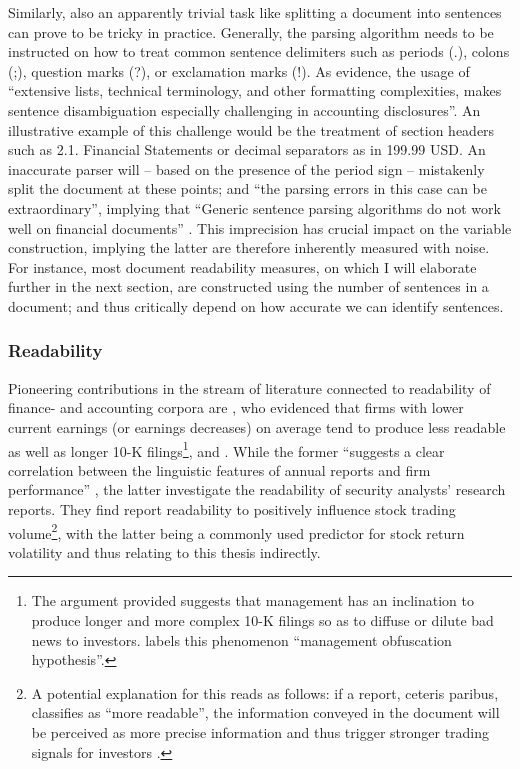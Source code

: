 Similarly, also an apparently trivial task like splitting a document into sentences can prove to be tricky in practice. Generally, the parsing algorithm needs to be instructed on how to treat common sentence delimiters such as periods (\textsf{.}), colons (\textsf{;}), question marks (\textsf{?}), or exclamation marks (\textsf{!}). As \textcite[1216]{LM-meta-2016} evidence, the usage of \enquote{extensive lists, technical terminology, and other formatting complexities, makes sentence disambiguation especially challenging in accounting disclosures}. An illustrative example of this challenge would be the treatment of section headers such as \textsf{2.1. Financial Statements} or decimal separators as in \textsf{199.99 USD}. An inaccurate parser will -- based on the presence of the period sign -- mistakenly split the document at these points; and \enquote{the parsing errors in this case can be extraordinary}, implying that \enquote{Generic sentence parsing algorithms do not work well on financial documents} \parencite[1216, 1217]{LM-meta-2016}. This imprecision has crucial impact on the variable construction, implying the latter are therefore inherently measured with noise. For instance, most document readability measures, on which I will elaborate further in the next section, are constructed using the number of sentences in a document; and thus critically depend on how accurate we can identify sentences. 

\subsubsection{Readability}
\label{sssec: lit_rev_mining_readability}
Pioneering contributions in the stream of literature connected to readability of finance- and accounting corpora are \textcite{Li2008}, who evidenced that firms with lower current earnings (or earnings decreases) on average tend to produce less readable as well as longer 10-K filings\footnote{The argument provided suggests that management has an inclination to produce longer and more complex 10-K filings so as to diffuse or dilute bad news to investors. \textcite[221]{Li2008} labels this phenomenon \enquote{management obfuscation hypothesis}.}, and \textcite{DeFranco2015}. While the former \enquote{suggests a clear correlation between the linguistic features of annual reports and firm performance} \parencite[222]{Li2008}, the latter investigate the readability of security analysts' research reports. They find report readability to positively influence stock trading volume\footnote{A potential explanation for this reads as follows: if a report, ceteris paribus, classifies as \enquote{more readable}, the information conveyed in the document will be perceived as more precise information and thus trigger stronger trading signals for investors \parencite{DeFranco2015}.}, with the latter being a commonly used predictor for stock return volatility and thus relating to this thesis indirectly.

